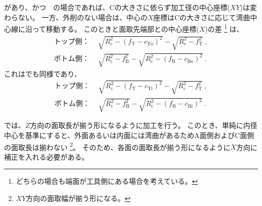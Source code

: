 \clearpage
\Outcut があり、かつ\EndFaceOutCChamfer　の場合であれば、Cの大きさに依らず加工径の中心座標($XY$)は変わらない。
一方、外削のない場合は、中心の$X$座標はCの大きさに応じて湾曲中心線に沿って移動する。
このとき\EndFace と面取先端部との中心座標($X$)の差
\footnote{どちらの場合も端面が工具側にある場合を考えている。}
は、
\begin{align*}
  \text{トップ側：}&~~
  \sqrt{R_\mathrm c^2-\left(f_\mathrm T-c_\mathrm{To}\right)^2}-\sqrt{R_\mathrm c^2-f_\mathrm T^2}\ ,\\
  \text{ボトム側：}&~~
  \sqrt{R_\mathrm c^2-f_\mathrm B^2}-\sqrt{R_\mathrm c^2-\left(f_\mathrm B-c_\mathrm{Bo}\right)^2}\ .
\end{align*}
これは\EndFaceInCChamfer でも同様であり、
\begin{align*}
  \text{トップ側：}&~~
  \sqrt{R_\mathrm c^2-\left(f_\mathrm T-c_\mathrm{Ti}\right)^2}-\sqrt{R_\mathrm c^2-f_\mathrm T^2}\ ,\\
  \text{ボトム側：}&~~
  \sqrt{R_\mathrm c^2-f_\mathrm B^2}-\sqrt{R_\mathrm c^2-\left(f_\mathrm B-c_\mathrm{Bi}\right)^2}\ .
\end{align*}



\EndFaceChamferMilling では、$Z$方向の面取長が揃う形になるように加工を行う。
このとき、単純に内径中心を基準にすると、外面あるいは内面には湾曲があるためA面側およびC面側の面取長は揃わない
\footnote{$XY$方向の面取幅が揃う形になる。}。
そのため、各面の面取長が揃う形になるように$X$方向に補正を入れる必要がある。



\clearpage


